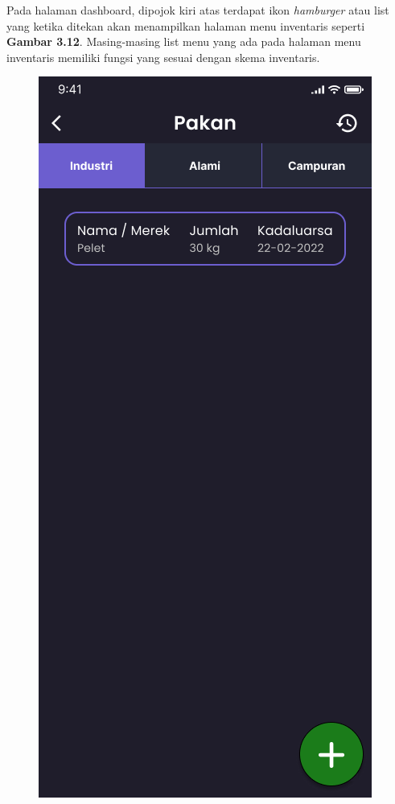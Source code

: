 \begin{spacing}{1.5}
	Pada halaman dashboard, dipojok kiri atas terdapat ikon \textit{hamburger} atau list yang ketika ditekan akan menampilkan halaman menu inventaris seperti \textbf{Gambar 3.12}. Masing-masing list menu yang ada pada halaman menu inventaris memiliki fungsi yang sesuai dengan skema inventaris.

	\begin{figure}[H]
			\includegraphics[width=\linewidth]{gambar/sprint1/mockup_detail_feed.png}

\end{figure}
\end{spacing}
